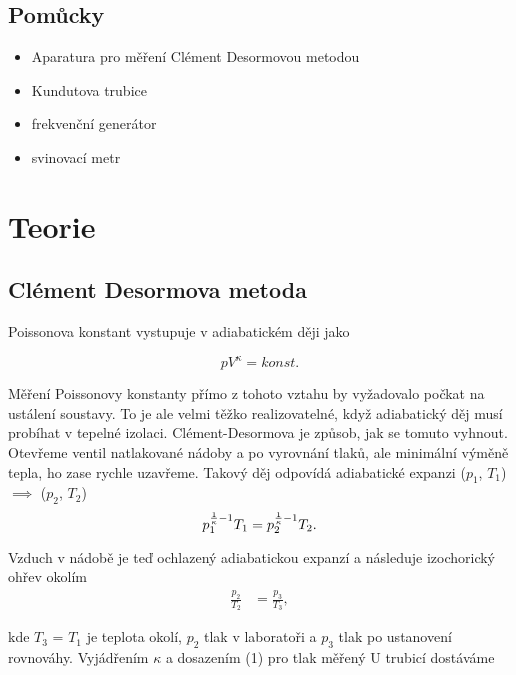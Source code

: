 \documentclass[a4paper,11pt]{article}
\begin{document}
\subsection{Pomůcky}

\begin{itemize}
  \item Aparatura pro měření Clément Desormovou metodou
  \item Kundutova trubice
  \item frekvenční generátor
  \item svinovací metr
\end{itemize}
 
\section{Teorie}

\subsection{Clément Desormova metoda}

Poissonova konstant vystupuje v adiabatickém ději jako

\begin{equation}
  pV^{\kappa} = konst.
\end{equation}

\noindent
Měření Poissonovy konstanty přímo z tohoto vztahu by vyžadovalo počkat na ustálení soustavy.
To je ale velmi těžko realizovatelné, když adiabatický děj musí probíhat v tepelné izolaci. Clément-Desormova je způsob, jak se tomuto vyhnout. 
Otevřeme ventil natlakované nádoby a po vyrovnání tlaků, ale minimální výměně tepla, ho zase rychle uzavřeme. Takový děj odpovídá adiabatické expanzi ($p_1$, $T_1$) $\implies$ ($p_2$, $T_2$) \\

\begin{equation}
  p_1^{\frac{1}{\kappa} -1} T_1 = p_2^{\frac{1}{\kappa} -1} T_2. \\
\end{equation}

\noindent
Vzduch v nádobě je teď ochlazený adiabatickou expanzí a následuje izochorický ohřev okolím \\ 

\begin{align}
  \frac{p_2}{T_2} &= \frac{p_3}{T_3},
\end{align}

\noindent
kde $T_3$ = $T_1$ je teplota okolí, $p_2$ tlak v laboratoři a $p_3$ tlak po ustanovení rovnováhy. 
Vyjádřením $\kappa$ a dosazením (1) pro tlak měřený U trubicí dostáváme
\end{document}

